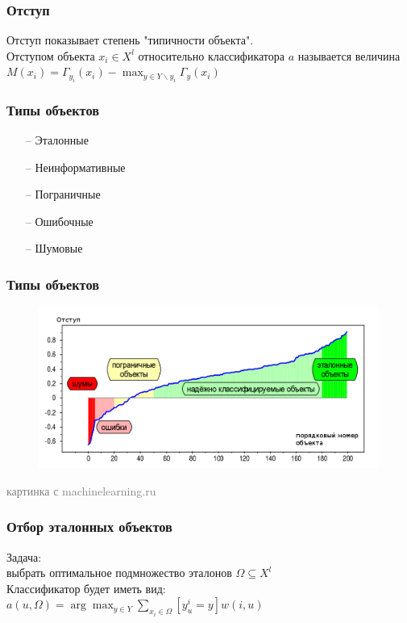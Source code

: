 \documentclass[12pt]{beamer}
\begin{document}
\begin{frame}\frametitle{Отступ}
Отступ показывает степень "типичности объекта".\\
\vspace{5mm}
Отступом объекта ${x_i \in X^l}$ относительно классификатора $a$ называется величина\\
${M(x_i) = \Gamma_{y_i}(x_i) - \max_{y \in Y\backslash y_i} \Gamma_y(x_i)}$

\end{frame}

\begin{frame}\frametitle{Типы объектов}
\begin{itemize}
	\item[--] Эталонные
	\item[--] Неинформативные
	\item[--] Пограничные	
	\item[--] Ошибочные	
	\item[--] Шумовые	
\end{itemize}
\end{frame}

\begin{frame}\frametitle{Типы объектов}

\begin{figure}[htbp]
\centering
\includegraphics[height=150pt]{margin}  
\end{figure}

\textcolor{gray}{картинка с machinelearning.ru}
\end{frame}

\begin{frame}\frametitle{Отбор эталонных объектов}
Задача:\\
выбрать оптимальное подмножество эталонов $\Omega\subseteq X^l$\\ 
\vspace{5mm}
Классификатор будет иметь вид:\\
${a(u, \Omega) = \arg\max_{y \in Y} \sum\limits_{x_i \in \Omega} [y_u^i = y]w(i, u) }$\\
\end{frame}
\end{document}
